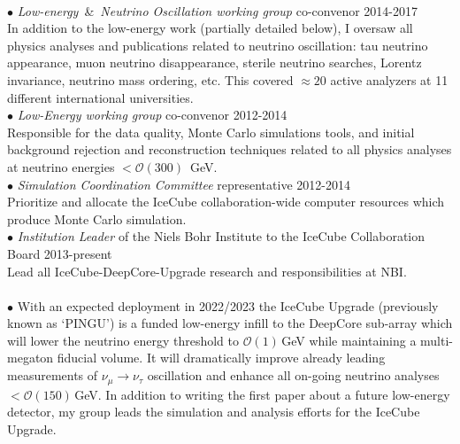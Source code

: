 \documentclass[a4paper,11pt]{article}
\renewcommand{\smallskip} {\vspace{0.1in}}
\begin{document}
\smallskip \\
%
$\bullet$ {\it Low-energy}~\&~{\it Neutrino Oscillation working group} co-convenor \hfill 2014-2017 \vspace{0.1cm} \\
\indent \indent In addition to the low-energy work (partially detailed below), I oversaw all physics analyses and publications related to neutrino oscillation: tau neutrino appearance, muon neutrino disappearance, sterile neutrino searches, Lorentz invariance, neutrino mass ordering, etc. This covered $\approx20$ active analyzers at 11 different international universities.
\smallskip \\
%
$\bullet$ {\it Low-Energy working group} co-convenor \hfill 2012-2014 \vspace{0.1cm} \\
\indent \indent Responsible for the data quality, Monte Carlo simulations tools, and initial background rejection and reconstruction techniques related to all physics analyses at neutrino energies $<\mathcal{O}(300)$~GeV.
\smallskip \\
%
$\bullet$ {\it Simulation Coordination Committee} representative \hfill 2012-2014 \vspace{0.1cm} \\
\indent \indent Prioritize and allocate the IceCube collaboration-wide computer resources which produce Monte Carlo simulation. \smallskip \\
%
$\bullet$ {\it Institution Leader} of the Niels Bohr Institute to the IceCube Collaboration Board \hfill 2013-present \vspace{0.1cm} \\
\indent \indent Lead all IceCube-DeepCore-Upgrade research and responsibilities at NBI.
\smallskip \\
%
\smallskip \\
%
$\bullet$ With an expected deployment in 2022/2023 the IceCube Upgrade (previously known as `PINGU') is a funded low-energy infill to the DeepCore sub-array which will lower the neutrino energy threshold to $\mathcal{O}(1)$\,GeV while maintaining a multi-megaton fiducial volume. It will dramatically improve already leading measurements of $\nu_\mu \rightarrow \nu_\tau$ oscillation and enhance all on-going neutrino analyses $<\mathcal{O}(150)$\,GeV. In addition to writing the first paper about a future low-energy detector, my group leads the simulation and analysis efforts for the IceCube Upgrade.%
 \smallskip
  \\
\end{document}

